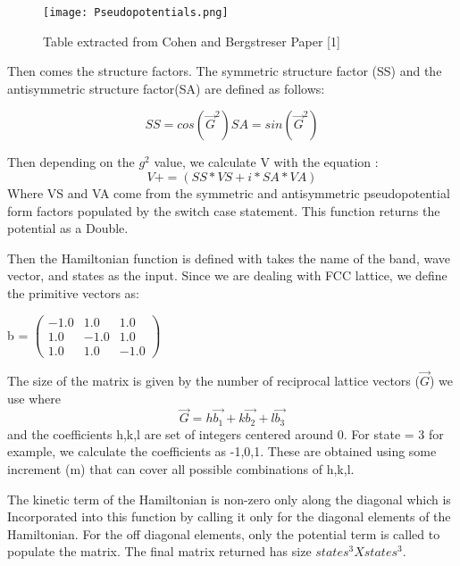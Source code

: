 \documentclass[%
 reprint,
 amsmath,amssymb,
 aps,
]{revtex4-2}
\begin{document}
\begin{figure}[H]
\texttt{[image: Pseudopotentials.png]}%
\caption{\label{fig:Hamiltonian} Table extracted from Cohen and Bergstreser Paper [1]}
\end{figure}

Then comes the structure factors. The symmetric structure factor (SS) and the antisymmetric structure factor(SA) are defined as follows: 

\begin{equation}
    SS = cos(\vec{G}^2)
    SA = sin(\vec{G}^2)
\end{equation}

Then depending on the $g^2$ value, we calculate V with the equation : 
\begin{equation}
    V += (SS*VS + i *SA*VA)
\end{equation}
Where VS and VA come from the symmetric and antisymmetric pseudopotential form factors populated by the switch case statement. This function returns the potential as a Double. 

Then the Hamiltonian function is defined with takes the name of the band, wave vector, and states as the input. 
Since we are dealing with FCC lattice, we define the primitive vectors as: 

b = $\begin{pmatrix}
-1.0 & 1.0 & 1.0\\
1.0 & -1.0 & 1.0\\
1.0 & 1.0 & -1.0
\end{pmatrix}$

The size of the matrix is given by the number of reciprocal lattice vectors ($\vec{G}$) we use where
\begin{equation}
    \vec{G} = h \vec{b_1} + k \vec{b_2} + l \vec{b_3}
\end{equation}
and the coefficients h,k,l are set of integers centered around 0. For state = 3 for example, we calculate the coefficients as {-1,0,1}. These are obtained using some increment (m) that can cover all possible combinations of {h,k,l}. 

The kinetic term of the Hamiltonian is non-zero only along the diagonal which is Incorporated into this function by calling it only for the diagonal elements of the Hamiltonian. For the off diagonal elements, only the potential term is called to populate the matrix. The final matrix returned has size $states^3 X states^3 $. \\
\end{document}
